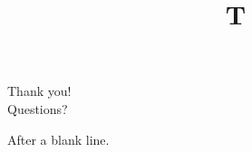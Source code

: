\documentclass[9pt]{beamer}
\title{T}
\begin{document}
\begin{frame}
\begin{center}
Thank you!\\
Questions?\\
\end{center}

After a blank line.
\end{frame}
\end{document}
